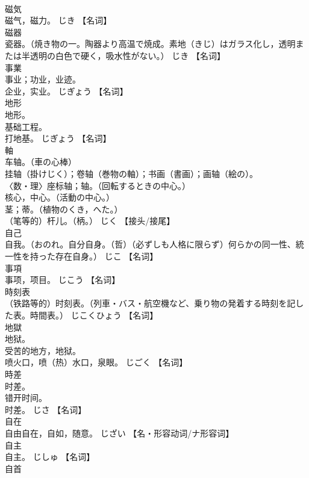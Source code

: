 \documentclass[8pt]{extreport}
\begin{document}
\begin{CJK}{UTF8}{min}
\\	磁気	
\\	磁气，磁力。	じき		【名词】
\\	磁器	
\\	瓷器。（焼き物の一。陶器より高温で焼成。素地（きじ）はガラス化し，透明または半透明の白色で硬く，吸水性がない。）	じき		【名词】
\\	事業	
\\	事业；功业，业迹。 
\\	企业，实业。	じぎょう		【名词】
\\	地形	
\\	地形。 
\\	基础工程。 
\\	打地基。	じぎょう		【名词】
\\	軸	
\\	车轴。（車の心棒） 
\\	挂轴（掛けじく）；卷轴（巻物の軸）；书画（書画）；画轴（絵の）。 
\\	〈数・理〉座标轴；轴。（回転するときの中心。） 
\\	核心，中心。（活動の中心。） 
\\	茎；蒂。（植物のくき，へた。） 
\\	（笔等的）杆儿。（柄。）	じく		【接头/接尾】
\\	自己	
\\	自我。（おのれ。自分自身。（哲）（必ずしも人格に限らず）何らかの同一性、統一性を持った存在自身。）	じこ		【名词】
\\	事項	
\\	事项，项目。	じこう		【名词】
\\	時刻表	
\\	（铁路等的）时刻表。（列車・バス・航空機など、乗り物の発着する時刻を記した表。時間表。）	じこくひょう		【名词】
\\	地獄	
\\	地狱。 
\\	受苦的地方，地狱。 
\\	喷火口，喷（热）水口，泉眼。	じごく		【名词】
\\	時差	
\\	时差。 
\\	错开时间。 
\\	时差。	じさ		【名词】
\\	自在	
\\	自由自在，自如，随意。	じざい		【名・形容动词/ナ形容词】
\\	自主	
\\	自主。	じしゅ		【名词】
\\	自首	

\end{CJK}
\end{document}

